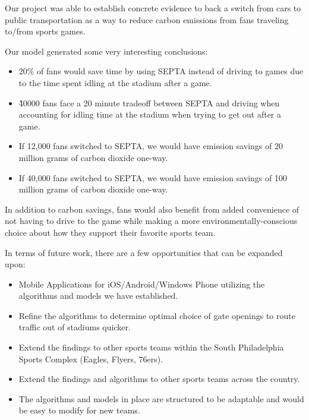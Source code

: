 Our project was able to establish concrete evidence to back a switch
from cars to public transportation as a way to reduce carbon emissions
from fans traveling to/from sports games.

Our model generated some very interesting conclusions:
\begin{itemize}
    \item 20\% of fans would save time by using SEPTA instead of
  driving to games due to the time spent idling at the stadium after a
  game.
    \item \~40000 fans face a 20 minute tradeoff between SEPTA and
  driving when accounting for idling time at the stadium when trying
  to get out after a game.
    \item If 12,000 fans switched to SEPTA, we would have emission
  savings of 20 million grams of carbon dioxide one-way.
    \item If 40,000 fans switched to SEPTA, we would have emission
  savings of 100 million grams of carbon dioxide one-way.
\end{itemize}

In addition to carbon savings, fans would also benefit from added
convenience of not having to drive to the game while making a more
environmentally-conscious choice about how they support their favorite
sports team.

In terms of future work, there are a few opportunities that can be
expanded upon:
\begin{itemize}
    \item Mobile Applications for iOS/Android/Windows Phone utilizing
  the algorithms and models we have established.
    \item Refine the algorithms to determine optimal choice of gate
  openings to route traffic out of stadiums quicker.
    \item Extend the findings to other sports teams within the South
  Philadelphia Sports Complex (Eagles, Flyers, 76ers).
    \item Extend the findings and algorithms to other sports teams
  across the country.
    \item The algorithms and models in place are structured to be
  adaptable and would be easy to modify for new teams.
\end{itemize}
